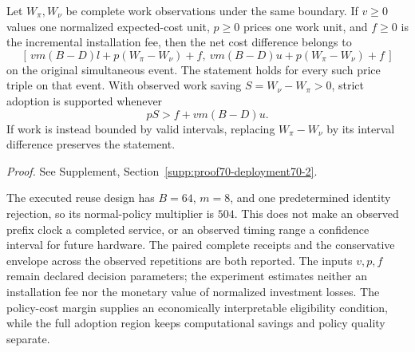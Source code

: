 \begin{proposition}\label{prop:adoption70}
Let $W_\pi,W_\nu$ be complete work observations under the same boundary. If $v\ge0$ values one normalized expected-cost unit, $p\ge0$ prices one work unit, and $f\ge0$ is the incremental installation fee, then the net cost difference belongs to
\begin{equation}\label{eq:adoption-region70}
 [\,vm(B-D)l+p(W_\pi-W_\nu)+f,
    \ vm(B-D)u+p(W_\pi-W_\nu)+f\,]
\end{equation}
on the original simultaneous event. The statement holds for every such price triple on that event. With observed work saving $S=W_\nu-W_\pi>0$, strict adoption is supported whenever
\[
 pS>f+vm(B-D)u.
\]
If work is instead bounded by valid intervals, replacing $W_\pi-W_\nu$ by its interval difference preserves the statement.
\end{proposition}
\noindent\emph{Proof.} See Supplement, Section~\ref{supp:proof70-deployment70-2}.


The executed reuse design has $B=64$, $m=8$, and one predetermined identity rejection, so its normal-policy multiplier is $504$. This does not make an observed prefix clock a completed service, or an observed timing range a confidence interval for future hardware. The paired complete receipts and the conservative envelope across the observed repetitions are both reported. The inputs $v,p,f$ remain declared decision parameters; the experiment estimates neither an installation fee nor the monetary value of normalized investment losses. The policy-cost margin supplies an economically interpretable eligibility condition, while the full adoption region keeps computational savings and policy quality separate.
